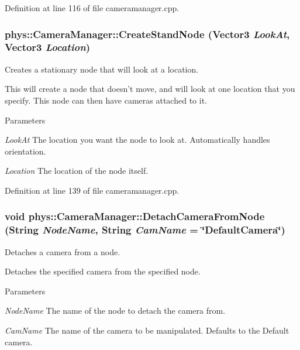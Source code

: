Definition at line 116 of file cameramanager.cpp.

\hypertarget{classphys_1_1CameraManager_ab5f9ca6b053670e69f5812cf573d5972}{
\subsubsection[{CreateStandNode}]{ phys::CameraManager::CreateStandNode ({\bf Vector3} {\em LookAt}, \/  {\bf Vector3} {\em Location})}}
\label{d9/d91/classphys_1_1CameraManager_ab5f9ca6b053670e69f5812cf573d5972}


Creates a stationary node that will look at a location. 

This will create a node that doesn't move, and will look at one location that you specify. This node can then have cameras attached to it. 
\begin{DoxyParams}{Parameters}
\item[{\em LookAt}]The location you want the node to look at. Automatically handles orientation. \item[{\em Location}]The location of the node itself. \end{DoxyParams}


Definition at line 139 of file cameramanager.cpp.

\hypertarget{classphys_1_1CameraManager_a5137bdb9dec706fa0fafec665d4f71c8}{
\subsubsection[{DetachCameraFromNode}]{\setlength{\rightskip}{0pt plus 5cm}void phys::CameraManager::DetachCameraFromNode ({\bf String} {\em NodeName}, \/  {\bf String} {\em CamName} = {\ttfamily \char`\"{}DefaultCamera\char`\"{}})}}
\label{d9/d91/classphys_1_1CameraManager_a5137bdb9dec706fa0fafec665d4f71c8}


Detaches a camera from a node. 

Detaches the specified camera from the specified node. 
\begin{DoxyParams}{Parameters}
\item[{\em NodeName}]The name of the node to detach the camera from. \item[{\em CamName}]The name of the camera to be manipulated. Defaults to the Default camera. \end{DoxyParams}


